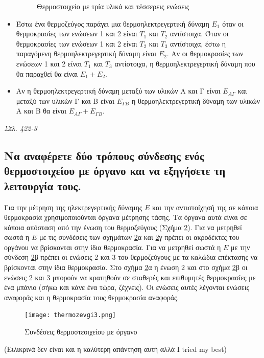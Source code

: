 \documentclass{article}
\begin{document}
\begin{itemize}
\begin{figure}[h!]
            \caption{Θερμοστοιχείο με τρία υλικά και τέσσερεις ενώσεις}
            \label{fig:7.1thermo2}
        \end{figure}
    \item Έστω ένα θερμοζεύγος παράγει μια θερμοηλεκτρεγερτική δύναμη $E_1$ όταν οι θερμοκρασίες των ενώσεων 1 και 2 είναι $T_1$ και $T_2$ αντίστοιχα. Όταν οι 
        θερμοκρασίες των ενώσεων 1 και 2 είναι $T_2$ και $T_3$ αντίστοιχα, έστω η παραγόμενη θερμοηλεκτρεγερτική δύναμη είναι $E_2$. Αν οι θερμοκρασίες των 
        ενώσεων 1 και 2 είναι $T_1$ και $T_3$ αντίστοιχα, η θερμοηλεκτρεγερτική δύναμη που θα παραχθεί θα είναι $E_1+E_2$. \item Αν η θερμοηλεκτρεγερτική δύναμη 
        μεταξύ των υλικών Α και Γ είναι $E_{A\Gamma}$ και μεταξύ των υλικών Γ και Β είναι $E_{\Gamma B}$ η θερμοηλεκτρεγερτική δύναμη των υλικών Α και Β θα είναι 
        $E_{A\Gamma} + E_{\Gamma B}$.
\end{itemize}

\emph{Σελ. 422-3}

\subsection{Να αναφέρετε δύο τρόπους σύνδεσης ενός θερμοστοιχείου με όργανο και να εξηγήσετε τη λειτουργία τους.}
Για την μέτρηση της ηλεκτρεγερτικής δύναμης $E$ και την αντιστοίχησή της σε κάποια θερμοκρασία χρησιμοποιούνται όργανα μέτρησης τάσης. Τα όργανα αυτά είναι σε 
κάποια απόσταση από την ένωση του θερμοζεύγους (Σχήμα \ref{thermozevgi3}). Για να μετρηθεί σωστά η $E$ με τις συνδέσεις των σχημάτων \ref{thermozevgi3}α και 
\ref{thermozevgi3}γ πρέπει οι ακροδέκτες του οργάνου να βρίσκονται στην ίδια θερμοκρασία. Για να μετρηθεί σωστά η $E$ με την σύνδεση \ref{thermozevgi3}β πρέπει οι 
ενώσεις 2 και 3 του θερμοζεύγους με τα καλώδια επέκτασης να βρίσκονται στην ίδια θερμοκρασία.  Στο σχήμα \ref{thermozevgi3}α η ένωση $2$ και στο σχήμα 
\ref{thermozevgi3}β οι ενώσεις $2$ και $3$ μπορούν να κρατηθούν σε σταθερές και επιθυμητές θερμοκρασίες με ένα μπάνιο (σήκω και κάνε ένα τώρα, ζέχνεις). 
Οι ενώσεις αυτές λέγονται ενώσεις αναφοράς και η θερμοκρασία τους θερμοκρασία αναφοράς. 

\begin{figure}[h!]
    \texttt{[image: thermozevgi3.png]}
    \caption{Συνδέσεις θερμοστεοιχείου με όργανο}
    \label{thermozevgi3}
\end{figure}

(Ειλικρινά δεν είναι και η καλύτερη απάντηση αυτή αλλά \foreignlanguage{english}{I tried my best})
\end{document}
